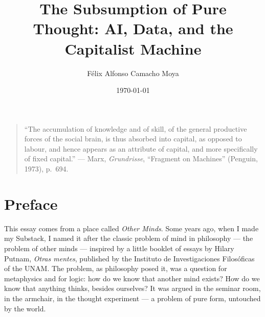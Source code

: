 \documentclass[11pt]{article}
\title{The Subsumption of Pure Thought: AI, Data, and the Capitalist Machine}
\author{Félix Alfonso Camacho Moya}
\date{\today}
\begin{document}
\maketitle

\begin{abstract}
\end{abstract}

\begin{quote}
\enquote{The accumulation of knowledge and of skill, of the general
productive forces of the social brain, is thus absorbed into capital,
as opposed to labour, and hence appears as an attribute of capital, and
more specifically of fixed capital.}
--- Marx, \textit{Grundrisse}, ``Fragment on Machines'' (Penguin, 1973),
p.~694.
\end{quote}

\section*{Preface}

This essay comes from a place called \emph{Other Minds}. Some years
ago, when I made my Substack, I named it after the classic problem of
mind in philosophy --- the problem of other minds --- inspired by a
little booklet of essays by Hilary Putnam, \textit{Otras mentes},
published by the Instituto de Investigaciones Filosóficas of the UNAM.
The problem, as philosophy posed it, was a question for metaphysics
and for logic: how do we know that another mind exists? How do we know
that anything thinks, besides ourselves? It was argued in the seminar
room, in the armchair, in the thought experiment --- a problem of pure
form, untouched by the world.
\end{document}
